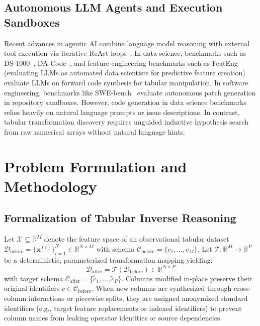 \documentclass[sigconf]{acmart}
\begin{document}
\subsection{Autonomous LLM Agents and Execution Sandboxes}
Recent advances in agentic AI combine language model reasoning with external tool execution via iterative ReAct loops~\cite{yao2023react,langgraph2024,madaan2023selfrefine}. In data science, benchmarks such as DS-1000~\cite{lai2023ds1000}, DA-Code~\cite{huang2024dacode}, and feature engineering benchmarks such as FeatEng~\cite{pietruszka2025feateng} (evaluating LLMs as automated data scientists for predictive feature creation) evaluate LLMs on forward code synthesis for tabular manipulation. In software engineering, benchmarks like SWE-bench~\cite{jimenez2024swebench} evaluate autonomous patch generation in repository sandboxes. However, code generation in data science benchmarks relies heavily on natural language prompts or issue descriptions. In contrast, tabular transformation discovery requires unguided inductive hypothesis search from raw numerical arrays without natural language hints.

\section{Problem Formulation and Methodology}

\subsection{Formalization of Tabular Inverse Reasoning}
Let $\mathcal{X} \subseteq \mathbb{R}^M$ denote the feature space of an observational tabular dataset $\mathcal{D}_{\text{before}} = \{\mathbf{x}^{(i)}\}_{i=1}^N \in \mathbb{R}^{N \times M}$ with schema $\mathcal{C}_{\text{before}} = \{c_1, \dots, c_M\}$. Let $\mathcal{T} : \mathbb{R}^M \to \mathbb{R}^P$ be a deterministic, parameterized transformation mapping yielding:
\begin{equation}
    \mathcal{D}_{\text{after}} = \mathcal{T}(\mathcal{D}_{\text{before}}) \in \mathbb{R}^{N \times P}
\end{equation}
with target schema $\mathcal{C}_{\text{after}} = \{\tilde{c}_1, \dots, \tilde{c}_P\}$. Columns modified in-place preserve their original identifiers $c \in \mathcal{C}_{\text{before}}$. When new columns are synthesized through cross-column interactions or piecewise splits, they are assigned anonymized standard identifiers (e.g., target feature replacements or indexed identifiers) to prevent column names from leaking operator identities or source dependencies.
\end{document}
